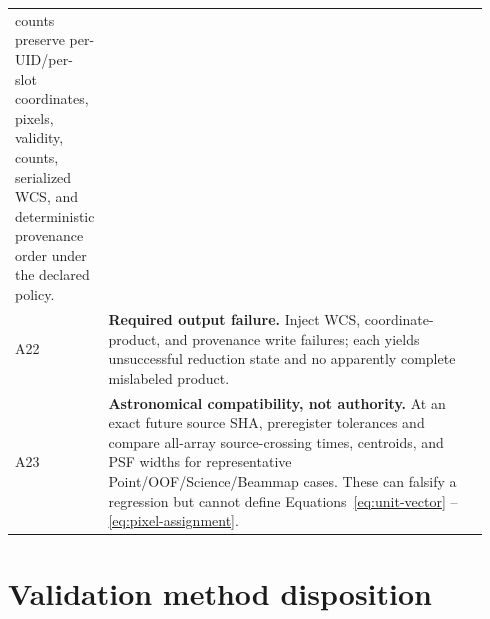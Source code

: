 \documentclass[11pt]{article}
\begin{document}
\begin{longtable}{>{\raggedright\arraybackslash}p{0.10\linewidth}
                  >{\raggedright\arraybackslash}p{0.84\linewidth}}
counts preserve per-UID/per-slot coordinates, pixels, validity, counts,
serialized WCS, and deterministic provenance order under the declared policy.
\\
A22 & \textbf{Required output failure.} Inject WCS, coordinate-product, and
provenance write failures; each yields unsuccessful reduction state and no
apparently complete mislabeled product. \\
A23 & \textbf{Astronomical compatibility, not authority.} At an exact future
source SHA, preregister tolerances and compare all-array source-crossing times,
centroids, and PSF widths for representative Point/OOF/Science/Beammap cases.
These can falsify a regression but cannot define Equations~\eqref{eq:unit-vector}
--\eqref{eq:pixel-assignment}. \\
\bottomrule
\end{longtable}

\section{Validation method disposition}
\end{document}

